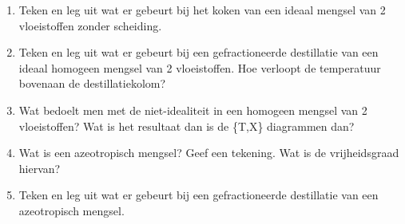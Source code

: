\documentclass[a4paper,12pt]{article}
\begin{document}
\begin{enumerate}
        \item Teken en leg uit wat er gebeurt bij het koken van een ideaal mengsel van 2 vloeistoffen zonder scheiding.
        \item Teken en leg uit wat er gebeurt bij een gefractioneerde destillatie van een ideaal homogeen mengsel van 2 vloeistoffen. Hoe verloopt de temperatuur bovenaan de destillatiekolom?
        \item Wat bedoelt men met de niet-idealiteit in een homogeen mengsel van 2 vloeistoffen? Wat is het resultaat dan is de \{T,X\} diagrammen dan?
        \item Wat is een azeotropisch mengsel? Geef een tekening. Wat is de vrijheidsgraad hiervan?
        \item Teken en leg uit wat er gebeurt bij een gefractioneerde destillatie van een azeotropisch mengsel.
    \end{enumerate}
\end{document}
